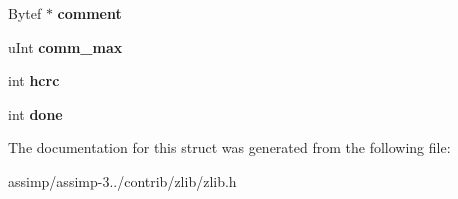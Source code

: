 \begin{DoxyCompactItemize}
\item 
\hypertarget{structgz__header__s_a56ef7ab667c9a969b1582122175f9e27}{Bytef $\ast$ {\bfseries comment}}\label{structgz__header__s_a56ef7ab667c9a969b1582122175f9e27}

\item 
\hypertarget{structgz__header__s_aa0529f45e5c08b3009cfc2a61a86aea0}{u\+Int {\bfseries comm\+\_\+max}}\label{structgz__header__s_aa0529f45e5c08b3009cfc2a61a86aea0}

\item 
\hypertarget{structgz__header__s_a29fa8de3acff8d8c7bad61dc924d8564}{int {\bfseries hcrc}}\label{structgz__header__s_a29fa8de3acff8d8c7bad61dc924d8564}

\item 
\hypertarget{structgz__header__s_ab8fd11f59b76a7d031e24bede8679d9d}{int {\bfseries done}}\label{structgz__header__s_ab8fd11f59b76a7d031e24bede8679d9d}

\end{DoxyCompactItemize}


The documentation for this struct was generated from the following file\+:\begin{DoxyCompactItemize}
\item 
assimp/assimp-\/3../contrib/zlib/zlib.\+h\end{DoxyCompactItemize}
